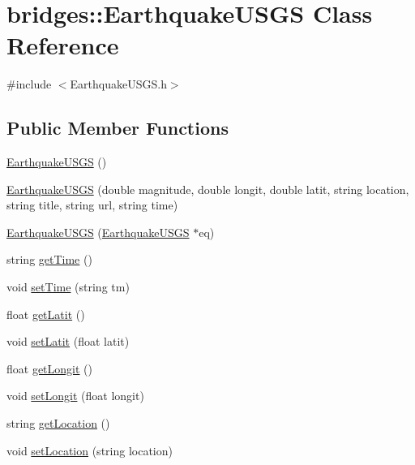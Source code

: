 \hypertarget{classbridges_1_1_earthquake_u_s_g_s}{}\section{bridges\+:\+:Earthquake\+U\+S\+GS Class Reference}
\label{classbridges_1_1_earthquake_u_s_g_s}


{\ttfamily \#include $<$Earthquake\+U\+S\+G\+S.\+h$>$}

\subsection*{Public Member Functions}
\begin{DoxyCompactItemize}
\item 
\hyperlink{classbridges_1_1_earthquake_u_s_g_s_a540ae74c248da179fbbd182b843a14e0}{Earthquake\+U\+S\+GS} ()
\item 
\hyperlink{classbridges_1_1_earthquake_u_s_g_s_a9c7f7aec2ddc173660a7015b90c7b7b0}{Earthquake\+U\+S\+GS} (double magnitude, double longit, double latit, string location, string title, string url, string time)
\item 
\hyperlink{classbridges_1_1_earthquake_u_s_g_s_aa52d05b3119c6a4e45867dc4aaeba59e}{Earthquake\+U\+S\+GS} (\hyperlink{classbridges_1_1_earthquake_u_s_g_s}{Earthquake\+U\+S\+GS} $\ast$eq)
\item 
string \hyperlink{classbridges_1_1_earthquake_u_s_g_s_a8d142b4ea194c5d839015ee7850a12c6}{get\+Time} ()
\item 
void \hyperlink{classbridges_1_1_earthquake_u_s_g_s_a70d79cd5c3666b8a32b1d45d7364054b}{set\+Time} (string tm)
\item 
float \hyperlink{classbridges_1_1_earthquake_u_s_g_s_abbae7f51eb9905e8ddada88d6127bf98}{get\+Latit} ()
\item 
void \hyperlink{classbridges_1_1_earthquake_u_s_g_s_a143678bb9dd697f82dcb260ddab78f82}{set\+Latit} (float latit)
\item 
float \hyperlink{classbridges_1_1_earthquake_u_s_g_s_a63c2fed8b27dace2b988dd9c0c937d70}{get\+Longit} ()
\item 
void \hyperlink{classbridges_1_1_earthquake_u_s_g_s_a745dc27f3c68a3ae996ceb7771d89ec5}{set\+Longit} (float longit)
\item 
string \hyperlink{classbridges_1_1_earthquake_u_s_g_s_aa04c172c5c77bd2f88b1dd319130b9eb}{get\+Location} ()
\item 
void \hyperlink{classbridges_1_1_earthquake_u_s_g_s_a5dc533759cc900440d70bdfc68f16599}{set\+Location} (string location)

\end{DoxyCompactItemize}
